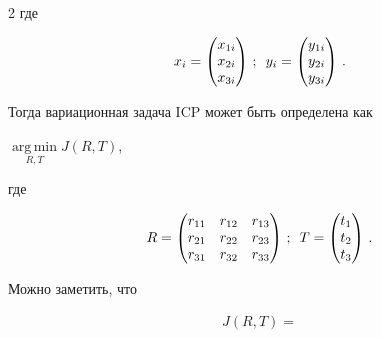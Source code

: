 \begin{multicols}{2}
 где

 $$

x_i=\begin{pmatrix}

x_{1i}\\ x_{2i}\\ x_{3i}

\end{pmatrix}\,;\enskip

y_i=\begin{pmatrix}

y_{1i}\\ y_{2i}\\ y_{3i}

\end{pmatrix}\,.

$$


  Тогда вариационная задача ICP может быть определена как


 $\mathop{\mathrm{arg\,min}}\limits_{ R,T} J(R,T)$,


где 

$$

R=\begin{pmatrix}

r_{11} & r_{12} & r_{13}\\

r_{21} & r_{22} & r_{23}\\

r_{31} & r_{32} & r_{33}\end{pmatrix}\,;\enskip

T=\begin{pmatrix}

t_1\\ t_2\\ t_3

\end{pmatrix}\,.

\vspace*{6pt}

$$



  

  Можно заметить, что

  \begin{multline}

  J(R,T)={}\\


\end{multline}
\end{multicols}
